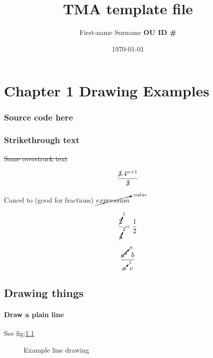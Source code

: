 \documentclass[fleqn]{report}
\title{\Large{\textbf{TMA template file}}}
\author{First-name Surname {\textbf{OU ID \#}}}
\date{\today}
\begin{document}
\begin{titlepage}
\maketitle
\end{titlepage}

\tableofcontents
\pagebreak


\pagestyle{fancy}
\fancyhf{}


\chapter{Chapter 1 Drawing Examples}

\subsection*{Source code here}

\subsection*{Strikethrough text}

\st{Some overstruck text}

\[ \frac{\cancel{3}.4^{n+1}}{\cancel{3}}\\ \]

Cancel to (good for fractions) $\cancelto{value}{expression}$

$$ \frac{\cancelto{1}{2}}{\cancelto{2}{4}} = \frac{1}{2}$$

$$ \frac{\cancelto{a}{a^2} \; \; b}{\cancelto{1}{a} \; \; c}$$

\section{Drawing things}

\subsubsection{Draw a plain line}
 See fig:\ref{Example line drawing}
\begin{figure}[ht]
\caption{Example line drawing}
\label{Example line drawing}
\end{figure}
\end{document}
